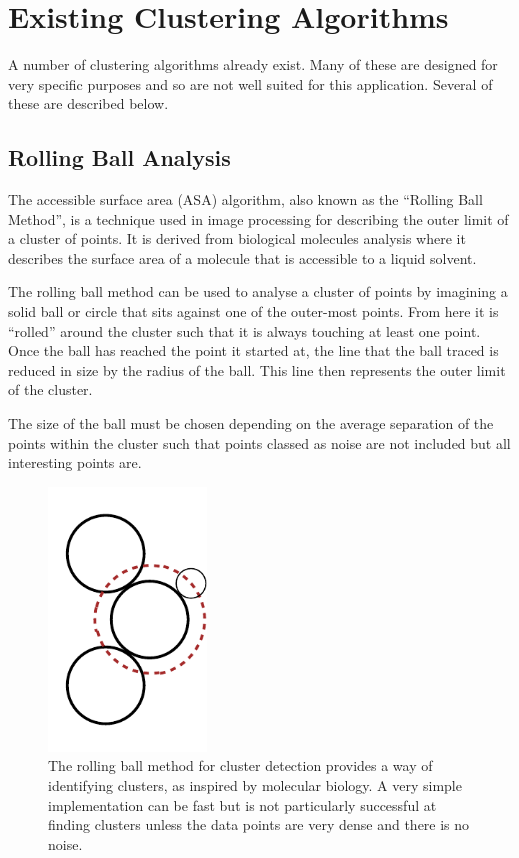 
\section{Existing Clustering Algorithms}
\label{sec:existing_clustering_algorithms}

A number of clustering algorithms already exist. Many of these are designed for
very specific purposes and so are not well suited for this application. Several
of these are described below.

\subsection{Rolling Ball Analysis}
\label{sub:rolling_ball_analysis}

The accessible surface area (ASA) algorithm, also known as the ``Rolling Ball
Method'', is a technique used in image processing for describing the outer
limit of a cluster of points. It is derived from biological molecules analysis
where it describes the surface area of a molecule that is accessible to a
liquid solvent.

The rolling ball method can be used to analyse a cluster of points by imagining
a solid ball or circle that sits against one of the outer-most points. From
here it is ``rolled'' around the cluster such that it is always touching at
least one point. Once the ball has reached the point it started at, the line
that the ball traced is reduced in size by the radius of the ball. This line
then represents the outer limit of the cluster.

The size of the ball must be chosen depending on the average separation of the
points within the cluster such that points classed as noise are not included
but all interesting points are.

\begin{figure}[tbhp]
	\centering
	\includegraphics[width=4.2cm]{rolling-ball.pdf}

	\caption[Rolling ball method for cluster analysis.]{The rolling ball method
		for cluster detection provides a way of identifying clusters, as
		inspired by molecular biology. A very simple implementation can be fast
		but is not particularly successful at finding clusters unless the data
		points are very dense and there is no noise.}\label{fig:rolling-ball}
\end{figure}

